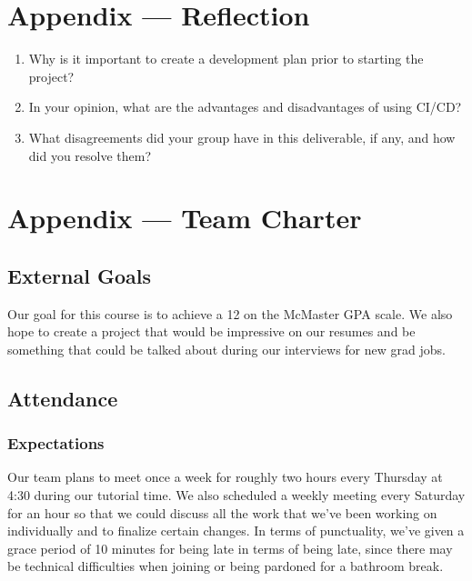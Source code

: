 \documentclass{article}
\begin{document}
\newpage{}

\section*{Appendix --- Reflection}




\begin{enumerate}
    \item Why is it important to create a development plan prior to starting the
    project?
    \item In your opinion, what are the advantages and disadvantages of using
    CI/CD?
    \item What disagreements did your group have in this deliverable, if any,
    and how did you resolve them?
\end{enumerate}

\newpage{}

\section*{Appendix --- Team Charter}


\subsection*{External Goals}

Our goal for this course is to achieve a 12 on the McMaster GPA scale. We also hope to create a project that would be impressive on our resumes and be something that could be talked about during our interviews for new grad jobs. 

\subsection*{Attendance}

\subsubsection*{Expectations}

Our team plans to meet once a week for roughly two hours every Thursday at 4:30 during our tutorial time. We also scheduled a weekly meeting every Saturday for an hour so that we could discuss all the work that we’ve been working on individually and to finalize certain changes. In terms of punctuality, we’ve given a grace period of 10 minutes for being late in terms of being late, since there may be technical difficulties when joining or being pardoned for a bathroom break. 
\end{document}
